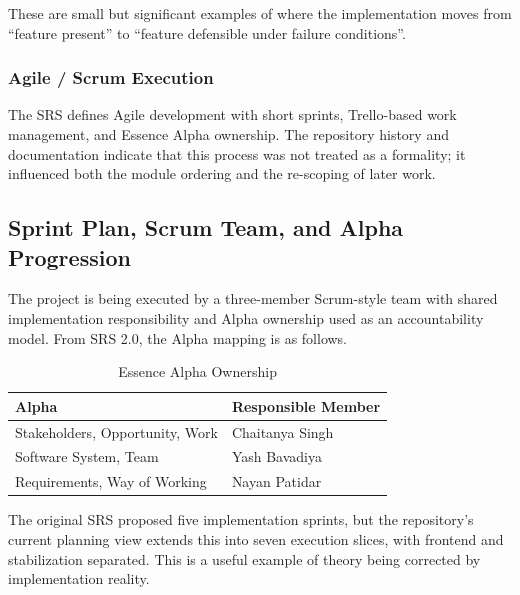 \documentclass[conference]{IEEEtran}
\begin{document}
These are small but significant examples of where the implementation moves from ``feature present'' to ``feature defensible under failure conditions''.

\subsubsection{Agile / Scrum Execution}
The SRS defines Agile development with short sprints, Trello-based work management, and Essence Alpha ownership. The repository history and documentation indicate that this process was not treated as a formality; it influenced both the module ordering and the re-scoping of later work.

\subsection{Sprint Plan, Scrum Team, and Alpha Progression}
The project is being executed by a three-member Scrum-style team with shared implementation responsibility and Alpha ownership used as an accountability model. From SRS 2.0, the Alpha mapping is as follows.

\begin{table}[!t]
\centering
\caption{Essence Alpha Ownership}
\begin{tabular}{|p{2cm}|p{4cm}|}
\hline
\textbf{Alpha} & \textbf{Responsible Member} \\
\hline
Stakeholders, Opportunity, Work & Chaitanya Singh \\
\hline
Software System, Team & Yash Bavadiya \\
\hline
Requirements, Way of Working & Nayan Patidar \\
\hline
\end{tabular}
\label{tab:alpha}
\end{table}

The original SRS proposed five implementation sprints, but the repository's current planning view extends this into seven execution slices, with frontend and stabilization separated. This is a useful example of theory being corrected by implementation reality.
\end{document}
